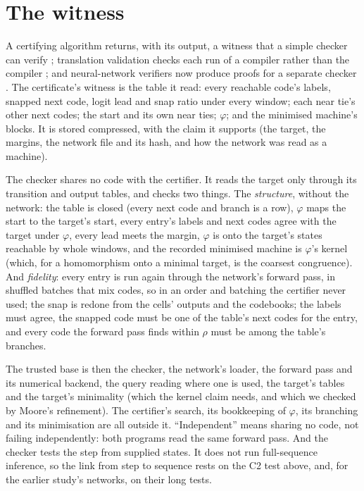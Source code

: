 \documentclass[11pt]{article}
\theoremstyle{definition}
\begin{document}
\section{The witness}
\label{sec:witness}

A certifying algorithm returns, with its output, a witness that a simple checker can verify
\citep{mcconnell-2011-certifying-algorithms}; translation validation checks each run of a compiler rather
than the compiler \citep{pnueli-1998-translation-validation}; and neural-network verifiers now produce
proofs for a separate checker
\citep{isac-2022-neural-network-verification-proof-production,desmartin-2024-certified-proof-checker-imandra}.
The certificate's witness is the table it read: every reachable code's labels, snapped next code,
logit lead and snap ratio under every window; each near tie's other next codes; the start and its
own near ties; $\varphi$; and the minimised machine's blocks. It is stored compressed, with the claim
it supports (the target, the margins, the network file and its hash, and how the network was read as
a machine).

The checker shares no code with the certifier. It reads the target only through its transition and
output tables, and checks two things. The \emph{structure}, without the network: the table is closed
(every next code and branch is a row), $\varphi$ maps the start to the target's start, every entry's
labels and next codes agree with the target under $\varphi$, every lead meets the margin, $\varphi$ is
onto the target's states reachable by whole windows, and the recorded minimised machine is $\varphi$'s kernel (which, for a
homomorphism onto a minimal target, is the coarsest congruence). And \emph{fidelity}: every entry is
run again through the network's forward pass, in shuffled batches that mix codes, so in an order and
batching the certifier never used; the snap is redone from the cells' outputs and the codebooks; the
labels must agree, the snapped code must be one of the table's next codes for the entry, and every
code the forward pass finds within $\rho$ must be among the table's branches.

The trusted base is then the checker, the network's loader, the forward pass and its numerical backend,
the query reading where one is used, the target's tables and the target's minimality (which the kernel
claim needs, and which we checked by Moore's refinement). The certifier's search, its bookkeeping of
$\varphi$, its branching and its minimisation are all outside it. ``Independent'' means sharing no code,
not failing independently: both programs read the same forward pass. And the checker tests the step from
supplied states. It does not run full-sequence inference, so the link from step to sequence rests on the
C2 test above, and, for the earlier study's networks, on their long tests.
\end{document}
